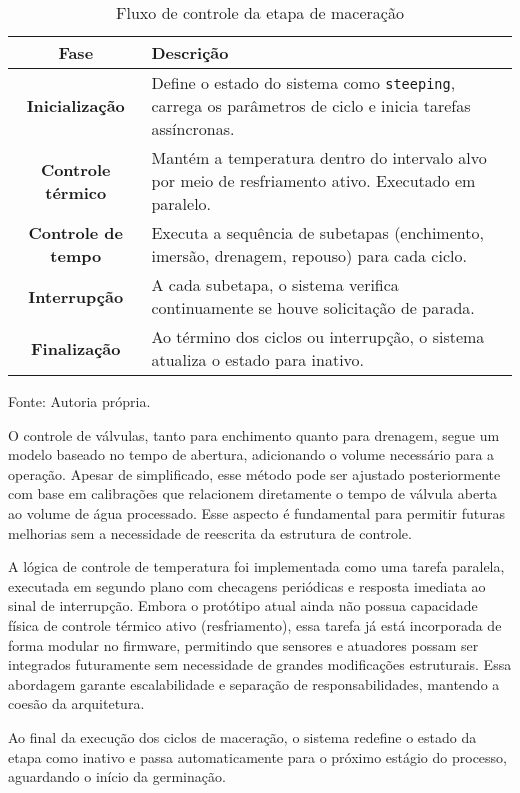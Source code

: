 \begin{table}[ht]
    \caption{Fluxo de controle da etapa de maceração}
    \label{tab:maceracao-fluxo}
    \centering
    \begin{tabular}{>{\bfseries}c p{10cm}}
        \hline
        Fase & Descrição \\
        \hline
        Inicialização & Define o estado do sistema como \texttt{steeping}, carrega os parâmetros de ciclo e inicia tarefas assíncronas. \\
        Controle térmico & Mantém a temperatura dentro do intervalo alvo por meio de resfriamento ativo. Executado em paralelo. \\
        Controle de tempo & Executa a sequência de subetapas (enchimento, imersão, drenagem, repouso) para cada ciclo. \\
        Interrupção & A cada subetapa, o sistema verifica continuamente se houve solicitação de parada. \\
        Finalização & Ao término dos ciclos ou interrupção, o sistema atualiza o estado para inativo. \\
        \hline
    \end{tabular}
    
    {\centering\footnotesize Fonte: Autoria própria.\par}
\end{table}

O controle de válvulas, tanto para enchimento quanto para drenagem, segue um modelo baseado no tempo de abertura, adicionando o volume necessário para a operação. Apesar de simplificado, esse método pode ser ajustado posteriormente com base em calibrações que relacionem diretamente o tempo de válvula aberta ao volume de água processado. Esse aspecto é fundamental para permitir futuras melhorias sem a necessidade de reescrita da estrutura de controle.

A lógica de controle de temperatura foi implementada como uma tarefa paralela, executada em segundo plano com checagens periódicas e resposta imediata ao sinal de interrupção. Embora o protótipo atual ainda não possua capacidade física de controle térmico ativo (resfriamento), essa tarefa já está incorporada de forma modular no firmware, permitindo que sensores e atuadores possam ser integrados futuramente sem necessidade de grandes modificações estruturais. Essa abordagem garante escalabilidade e separação de responsabilidades, mantendo a coesão da arquitetura.

Ao final da execução dos ciclos de maceração, o sistema redefine o estado da etapa como inativo e passa automaticamente para o próximo estágio do processo, aguardando o início da germinação.


